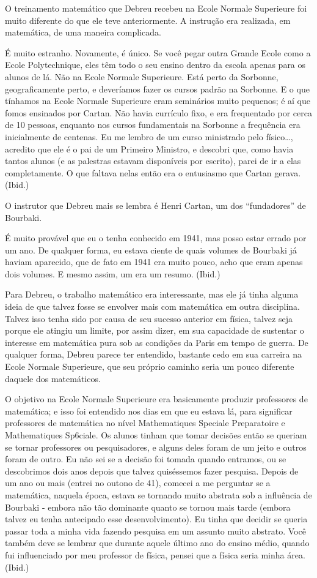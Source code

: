 \documentclass[12pt]{article}
\begin{document}
O treinamento matemático que Debreu recebeu na Ecole Normale Superieure foi muito diferente do que ele teve anteriormente. A instrução era realizada, em matemática, de uma maneira complicada.

É muito estranho. Novamente, é único. Se você pegar outra Grande Ecole como a Ecole Polytechnique, eles têm todo o seu ensino dentro da escola apenas para os alunos de lá. Não na Ecole Normale Superieure. Está perto da Sorbonne, geograficamente perto, e deveríamos fazer os cursos padrão na Sorbonne. E o que tínhamos na Ecole Normale Superieure eram seminários muito pequenos; é aí que fomos ensinados por Cartan. Não havia currículo fixo, e era frequentado por cerca de 10 pessoas, enquanto nos cursos fundamentais na Sorbonne a frequência era inicialmente de centenas. Eu me lembro de um curso ministrado pelo físico…, acredito que ele é o pai de um Primeiro Ministro, e descobri que, como havia tantos alunos (e as palestras estavam disponíveis por escrito), parei de ir a elas completamente. O que faltava nelas então era o entusiasmo que Cartan gerava. (Ibid.)

O instrutor que Debreu mais se lembra é Henri Cartan, um dos “fundadores” de Bourbaki.

É muito provável que eu o tenha conhecido em 1941, mas posso estar errado por um ano. De qualquer forma, eu estava ciente de quais volumes de Bourbaki já haviam aparecido, que de fato em 1941 era muito pouco, acho que eram apenas dois volumes. E mesmo assim, um era um resumo. (Ibid.)

Para Debreu, o trabalho matemático era interessante, mas ele já tinha alguma ideia de que talvez fosse se envolver mais com matemática em outra disciplina. Talvez isso tenha sido por causa de seu sucesso anterior em física, talvez seja porque ele atingiu um limite, por assim dizer, em sua capacidade de sustentar o interesse em matemática pura sob as condições da Paris em tempo de guerra. De qualquer forma, Debreu parece ter entendido, bastante cedo em sua carreira na Ecole Normale Superieure, que seu próprio caminho seria um pouco diferente daquele dos matemáticos.

O objetivo na Ecole Normale Superieure era basicamente produzir professores de matemática; e isso foi entendido nos dias em que eu estava lá, para significar professores de matemática no nível Mathematiques Speciale Preparatoire e Mathematiques Sp6ciale. Os alunos tinham que tomar decisões então se queriam se tornar professores ou pesquisadores, e alguns deles foram de um jeito e outros foram de outro. Eu não sei se a decisão foi tomada quando entramos, ou se descobrimos dois anos depois que talvez quiséssemos fazer pesquisa. Depois de um ano ou mais (entrei no outono de 41), comecei a me perguntar se a matemática, naquela época, estava se tornando muito abstrata sob a influência de Bourbaki - embora não tão dominante quanto se tornou mais tarde (embora talvez eu tenha antecipado esse desenvolvimento). Eu tinha que decidir se queria passar toda a minha vida fazendo pesquisa em um assunto muito abstrato. Você também deve se lembrar que durante aquele último ano do ensino médio, quando fui influenciado por meu professor de física, pensei que a física seria minha área. (Ibid.)
\end{document}
